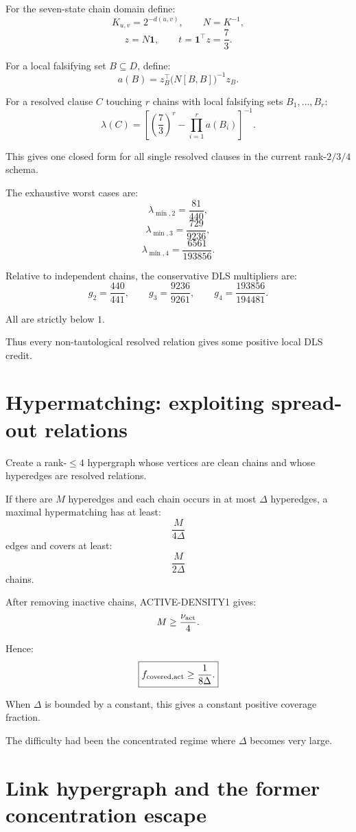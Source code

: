 \documentclass[11pt]{article}
\theoremstyle{plain}
\theoremstyle{definition}
\theoremstyle{remark}
\begin{document}
For the seven-state chain domain define:
\[
K_{u,v}=2^{-d(u,v)},
\qquad
N=K^{-1},
\]
\[
z=N\mathbf1,
\qquad
t=\mathbf1^\top z=\frac73.
\]

For a local falsifying set \(B\subseteq D\), define:
\[
a(B)
=
z_B^\top
\bigl(N[B,B]\bigr)^{-1}
z_B.
\]

For a resolved clause \(C\) touching \(r\) chains with local falsifying sets
\(B_1,\ldots,B_r\):
\[
\boxed{
\lambda(C)
=
\left[
\left(\frac73\right)^r
-
\prod_{i=1}^{r}a(B_i)
\right]^{-1}.
}
\]

This gives one closed form for all single resolved clauses in the current
rank-\(2/3/4\) schema.

The exhaustive worst cases are:
\[
\lambda_{\min,2}=\frac{81}{440},
\]
\[
\lambda_{\min,3}=\frac{729}{9236},
\]
\[
\lambda_{\min,4}=\frac{6561}{193856}.
\]

Relative to independent chains, the conservative DLS multipliers are:
\[
g_2=\frac{440}{441},
\qquad
g_3=\frac{9236}{9261},
\qquad
g_4=\frac{193856}{194481}.
\]

All are strictly below \(1\).

Thus every non-tautological resolved relation gives some positive local DLS
credit.

\section{Hypermatching: exploiting spread-out relations}

Create a rank-\(\le4\) hypergraph whose vertices are clean chains and whose
hyperedges are resolved relations.

If there are \(M\) hyperedges and each chain occurs in at most \(\Delta\)
hyperedges, a maximal hypermatching has at least:
\[
\frac{M}{4\Delta}
\]
edges and covers at least:
\[
\frac{M}{2\Delta}
\]
chains.

After removing inactive chains, ACTIVE-DENSITY1 gives:
\[
M\ge\frac{\nu_{\rm act}}4.
\]

Hence:
\[
\boxed{
f_{\rm covered,act}
\ge
\frac1{8\Delta}.
}
\]

When \(\Delta\) is bounded by a constant, this gives a constant positive
coverage fraction.

The difficulty had been the concentrated regime where \(\Delta\) becomes very
large.

\section{Link hypergraph and the former concentration escape}
\end{document}
